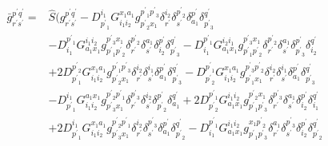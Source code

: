 \documentclass[aip,onecolumn,preprint]{revtex4-1}
\begin{document}
  \begin{align}
  \label{eq:g}
{{\bar{g}^{p^\prime q^\prime}_{r^\prime s^\prime}}} = 
  & \hat{S} (  {{g^{p^\prime q^\prime }_{r^\prime s^\prime}}} - {{D^{{i_1}}_{{{p^\prime}_1}}}{G^{{x_1}{a_1}}_{{i_1}{i_2}}}{g^{{{p^\prime}_1}{{p^\prime}_3}}_{{{p^\prime}_2}{x_1}}}{\delta^{{i_2}}_{r^\prime}}{\delta^{{{p^\prime}_2}}_{s^\prime}}{\delta^{p^\prime}_{{a_1}}}{\delta^{q^\prime}_{{{p^\prime}_3}}}} \nonumber \\
  & - {{D^{{{p^\prime}_1}}_{{i_1}}}{G^{{i_1}{i_2}}_{{a_1}{x_1}}}{g^{{{p^\prime}_3}{x_1}}_{{{p^\prime}_1}{{p^\prime}_2}}}{\delta^{{{p^\prime}_2}}_{r^\prime}}{\delta^{{a_1}}_{s^\prime}}{\delta^{p^\prime}_{{i_2}}}{\delta^{q^\prime}_{{{p^\prime}_3}}}} - {{D^{{{p^\prime}_1}}_{{i_1}}}{G^{{i_2}{i_1}}_{{a_1}{x_1}}}{g^{{{p^\prime}_3}{x_1}}_{{{p^\prime}_1}{{p^\prime}_2}}}{\delta^{{{p^\prime}_2}}_{r^\prime}}{\delta^{{a_1}}_{s^\prime}}{\delta^{p^\prime}_{{{p^\prime}_3}}}{\delta^{q^\prime}_{{i_2}}}} \nonumber \\
  & + {{{2}}{D^{{{p^\prime}_2}}_{{{p^\prime}_1}}}{G^{{x_1}{a_1}}_{{i_1}{i_2}}}{g^{{{p^\prime}_1}{{p^\prime}_3}}_{{{p^\prime}_2}{x_1}}}{\delta^{{i_2}}_{r^\prime}}{\delta^{{i_1}}_{s^\prime}}{\delta^{p^\prime}_{{a_1}}}{\delta^{q^\prime}_{{{p^\prime}_3}}}} - {{D^{{{p^\prime}_1}}_{{{p^\prime}_2}}}{G^{{x_1}{a_1}}_{{i_1}{i_2}}}{g^{{{p^\prime}_3}{{p^\prime}_2}}_{{{p^\prime}_1}{x_1}}}{\delta^{{i_2}}_{r^\prime}}{\delta^{{i_1}}_{s^\prime}}{\delta^{p^\prime}_{{a_1}}}{\delta^{q^\prime}_{{{p^\prime}_3}}}} \nonumber \\
  & - {{D^{{i_1}}_{{{p^\prime}_1}}}{G^{{a_1}{x_1}}_{{i_1}{i_2}}}{g^{{{p^\prime}_2}{{p^\prime}_1}}_{{{p^\prime}_3}{x_1}}}{\delta^{{{p^\prime}_3}}_{r^\prime}}{\delta^{{i_2}}_{s^\prime}}{\delta^{p^\prime}_{{{p^\prime}_2}}}{\delta^{q^\prime}_{{a_1}}}} + {{{2}}{D^{{{p^\prime}_1}}_{{{p^\prime}_2}}}{G^{{i_1}{i_2}}_{{a_1}{x_1}}}{g^{{{p^\prime}_2}{x_1}}_{{{p^\prime}_1}{{p^\prime}_3}}}{\delta^{{{p^\prime}_3}}_{r^\prime}}{\delta^{{a_1}}_{s^\prime}}{\delta^{p^\prime}_{{i_2}}}{\delta^{q^\prime}_{{i_1}}}} \nonumber \\
  & + {{{2}}{D^{{i_1}}_{{{p^\prime}_1}}}{G^{{x_1}{a_1}}_{{i_1}{i_2}}}{g^{{{p^\prime}_2}{{p^\prime}_1}}_{{{p^\prime}_3}{x_1}}}{\delta^{{i_2}}_{r^\prime}}{\delta^{{{p^\prime}_3}}_{s^\prime}}{\delta^{p^\prime}_{{a_1}}}{\delta^{q^\prime}_{{{p^\prime}_2}}}} - {{D^{{{p^\prime}_1}}_{{i_1}}}{G^{{i_1}{i_2}}_{{a_1}{x_1}}}{g^{{x_1}{{p^\prime}_2}}_{{{p^\prime}_1}{{p^\prime}_3}}}{\delta^{{a_1}}_{r^\prime}}{\delta^{{{p^\prime}_3}}_{s^\prime}}{\delta^{p^\prime}_{{i_2}}}{\delta^{q^\prime}_{{{p^\prime}_2}}}} \nonumber \\

\end{align}
\end{document}

